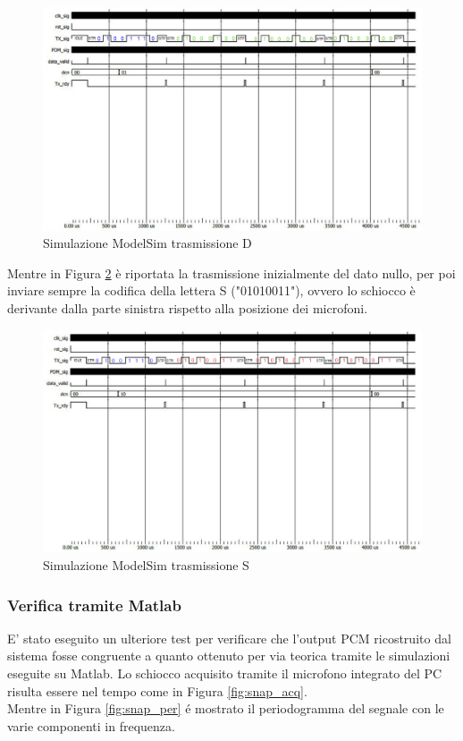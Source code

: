 \documentclass[a4paper, titlepage]{article}
\begin{document}
\begin{figure}[H]
    \centering
    \includegraphics[width=1\textwidth]{dx_dx.PNG}
    \caption{Simulazione ModelSim trasmissione D}
    \label{fig:dx_dx}
\end{figure}
\noindent Mentre in Figura \ref{fig:sx_sx} è riportata la trasmissione inizialmente del dato nullo, per poi inviare sempre la codifica della lettera S ("01010011"), ovvero lo schiocco è derivante dalla parte sinistra rispetto alla posizione dei microfoni.
\begin{figure}[H]
    \centering
    \includegraphics[width=1\textwidth]{sx_sx.PNG}
    \caption{Simulazione ModelSim trasmissione S}
    \label{fig:sx_sx}
\end{figure}
\subsubsection{Verifica tramite Matlab}
E' stato eseguito un ulteriore test per verificare che l'output PCM ricostruito dal sistema fosse congruente a quanto ottenuto per via teorica tramite le simulazioni eseguite su Matlab.
\newline
Lo schiocco acquisito tramite il microfono integrato del PC risulta essere nel tempo come in Figura \ref{fig:snap_acq}.\\Mentre in Figura \ref{fig:snap_per} é mostrato il periodogramma del segnale con le varie componenti in frequenza.
\end{document}
